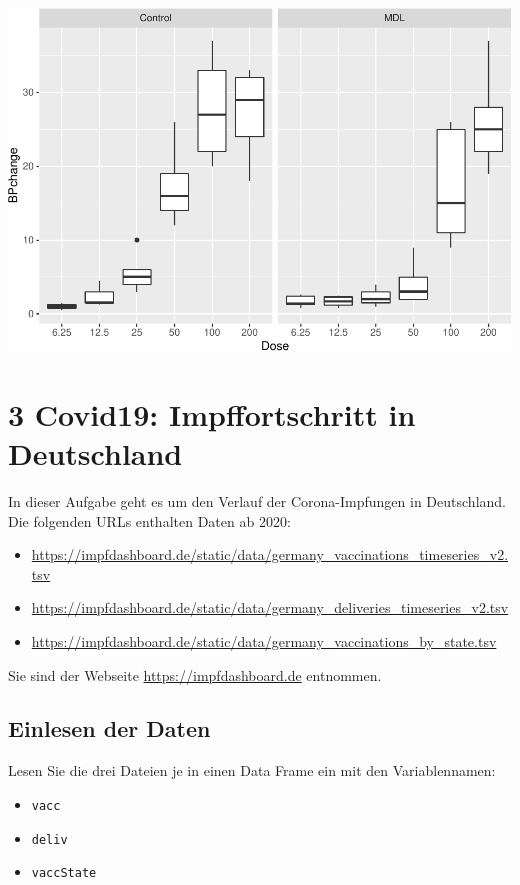 \documentclass[
]{article}
\providecommand{\tightlist}{%
  \setlength{\itemsep}{0pt}\setlength{\parskip}{0pt}}
\begin{document}
\includegraphics{Testat_1_Complete_files/figure-latex/unnamed-chunk-13-1.pdf}

\hypertarget{covid19-impffortschritt-in-deutschland}{%
\section{3 Covid19: Impffortschritt in
Deutschland}\label{covid19-impffortschritt-in-deutschland}}

In dieser Aufgabe geht es um den Verlauf der Corona-Impfungen in
Deutschland. Die folgenden URLs enthalten Daten ab 2020:

\begin{itemize}
\tightlist
\item
  \url{https://impfdashboard.de/static/data/germany_vaccinations_timeseries_v2.tsv}
\item
  \url{https://impfdashboard.de/static/data/germany_deliveries_timeseries_v2.tsv}
\item
  \url{https://impfdashboard.de/static/data/germany_vaccinations_by_state.tsv}
\end{itemize}

Sie sind der Webseite \url{https://impfdashboard.de} entnommen.

\hypertarget{einlesen-der-daten}{%
\subsection{Einlesen der Daten}\label{einlesen-der-daten}}

Lesen Sie die drei Dateien je in einen Data Frame ein mit den
Variablennamen:

\begin{itemize}
\tightlist
\item
  \texttt{vacc}
\item
  \texttt{deliv}
\item
  \texttt{vaccState}
\end{itemize}
\end{document}
